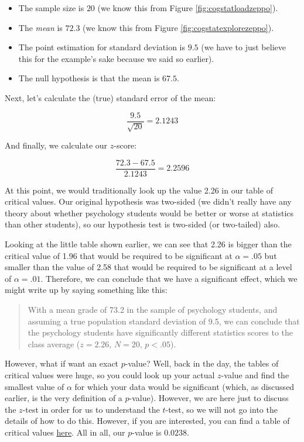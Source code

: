 \documentclass[
]{book}
\providecommand{\tightlist}{%
  \setlength{\itemsep}{0pt}\setlength{\parskip}{0pt}}
\theoremstyle{definition}
\theoremstyle{definition}
\theoremstyle{definition}
\theoremstyle{definition}
\theoremstyle{remark}
\begin{document}
\begin{itemize}
\tightlist
\item
  The sample size is \(20\) (we know this from Figure \ref{fig:cogstatloadzeppo}).
\item
  The \emph{mean} is \(72.3\) (we know this from Figure \ref{fig:cogstatexplorezeppo}).
\item
  The point estimation for standard deviation is \(9.5\) (we have to just believe this for the example's sake because we said so earlier).
\item
  The null hypothesis is that the mean is \(67.5\).
\end{itemize}

Next, let's calculate the (true) standard error of the mean:

\[
\frac{9.5}{\sqrt{20}} = 2.1243
\]

And finally, we calculate our \(z\)-score:

\[
\frac{72.3-67.5}{2.1243} = 2.2596
\]

At this point, we would traditionally look up the value 2.26 in our table of critical values. Our original hypothesis was two-sided (we didn't really have any theory about whether psychology students would be better or worse at statistics than other students), so our hypothesis test is two-sided (or two-tailed) also.

Looking at the little table shown earlier, we can see that 2.26 is bigger than the critical value of 1.96 that would be required to be significant at \(\alpha = .05\) but smaller than the value of 2.58 that would be required to be significant at a level of \(\alpha = .01\). Therefore, we can conclude that we have a significant effect, which we might write up by saying something like this:

\begin{quote}
With a mean grade of 73.2 in the sample of psychology students, and assuming a true population standard deviation of 9.5, we can conclude that the psychology students have significantly different statistics scores to the class average (\(z = 2.26\), \(N=20\), \(p<.05\)).
\end{quote}

However, what if want an exact \(p\)-value? Well, back in the day, the tables of critical values were huge, so you could look up your actual \(z\)-value and find the smallest value of \(\alpha\) for which your data would be significant (which, as discussed earlier, is the very definition of a \(p\)-value). However, we are here just to discuss the \(z\)-test in order for us to understand the \(t\)-test, so we will not go into the details of how to do this. However, if you are interested, you can find a table of critical values \href{https://www.statisticshowto.datasciencecentral.com/probability-and-statistics/z-table/}{here}. All in all, our \(p\)-value is \(0.0238\).
\end{document}
